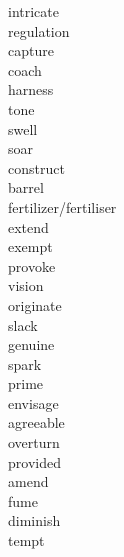 \documentclass[b5paper, 11pt]{ctexart}
\begin{document}
\begin{multicols*}{3}
\begin{description}
\item[intricate]

\item[regulation]

\item[capture]

\item[coach]

\item[harness]

\item[tone]

\item[swell]

\item[soar]

\item[construct]

\item[barrel]

\item[fertilizer/fertiliser]

\item[extend]

\item[exempt]

\item[provoke]

\item[vision]

\item[originate]

\item[slack]

\item[genuine]

\item[spark]

\item[prime]

\item[envisage]

\item[agreeable]

\item[overturn]

\item[provided]

\item[amend]

\item[fume]

\item[diminish]

\item[tempt]


\end{description}
\end{multicols*}
\end{document}
